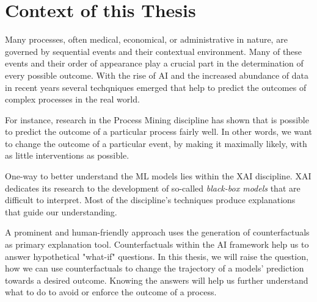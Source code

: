 \documentclass[./../../paper.tex]{subfiles}
\begin{document}
\section{Context of this Thesis}
Many processes, often medical, economical, or administrative in nature, are governed by sequential events and their contextual environment. Many of these events and their order of appearance play a crucial part in the determination of every possible outcome. With the rise of AI and the increased abundance of data in recent years several techqniques emerged that help to predict the outcomes of complex processes in the real world.

For instance, research in the Process Mining discipline has shown that is possible to predict the outcome of a particular process fairly well\needscite{}.  In other words, we want to change the outcome of a particular event, by making it maximally likely, with as little interventions as possible. 

One-way to better understand the \gls{ML} models lies within the \gls{XAI} discipline. \gls{XAI} dedicates its research to the  development of so-called \emph{black-box models} that are  difficult to interpret. Most of the discipline's techniques produce explanations that guide our understanding.

A prominent and human-friendly approach uses the generation of counterfactuals as primary explanation tool. Counterfactuals within the AI framework help us to answer hypothetical "what-if" questions. In this thesis, we will raise the question, how we can use counterfactuals to change the trajectory of a models' prediction towards a desired outcome.  
Knowing the answers will help us further understand what to do to avoid or enforce the outcome of a process.
\end{document}
